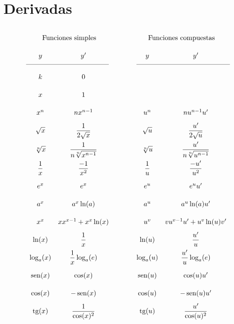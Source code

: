 \section*{Derivadas}
\small
{}

\centering
\begin{tcolorbox}[hbox, title=Derivadas básicas]
\begin{minipage}{0.7\textwidth}
\[
  \def\arraystretch{2.15}
  \begin{array}{ccccc}
  \multicolumn{2}{c}{\mbox{Funciones simples}} & &  \multicolumn{2}{c}{\mbox{Funciones compuestas}}\\
  y            & y'                            & \qquad & y            & y'\\
  \cmidrule(r){1-2}\cmidrule(l){4-5}
  k            & 0\\
  x            & 1\\ 
  x^n          & nx^{n-1}                      & \qquad & u^n          & nu^{n-1}u'\\
  \sqrt{x}     & \dfrac{1}{2\sqrt{x}}          & \qquad & \sqrt{u}     & \dfrac{u'}{2\sqrt{u}}\\
  \sqrt[n]{x}  & \dfrac{1}{n\sqrt[n]{x^{n-1}}} & \qquad & \sqrt[n]{u}  & \dfrac{u'}{n\sqrt[n]{u^{n-1}}}\\
  \dfrac{1}{x} & \dfrac{-1}{x^2}               & \qquad & \dfrac{1}{u} & \dfrac{-u'}{u^2}\\  
  e^x          & e^x                           & \qquad & e^u          & e^u u'\\
  a^x          & a^x\ln(a)                     & \qquad & a^u          & a^u\ln(a)u'\\
  x^x          & xx^{x-1}+x^x\ln(x)            & \qquad & u^v          & vu^{v-1}u'+u^v\ln(u) v'\\
  \ln(x)       & \dfrac{1}{x}                  & \qquad & \ln(u)       & \dfrac{u'}{u}\\
  \log_a(x)    & \dfrac{1}{x}\log_a(e)         & \qquad & \log_a(u)    & \dfrac{u'}{u}\log_a(e)\\
  \sen(x)      & \cos(x)                       & \qquad & \sen(u)      & \cos(u)u'\\
  \cos(x)      & -\sen(x)                      & \qquad & \cos(u)      & -\sen(u)u'\\
  \tg(x)       & \dfrac{1}{\cos(x)^2}          & \qquad & \tg(u)       & \dfrac{u'}{\cos(u)^2}\\

\end{array}\]
\end{minipage}
\end{tcolorbox}
